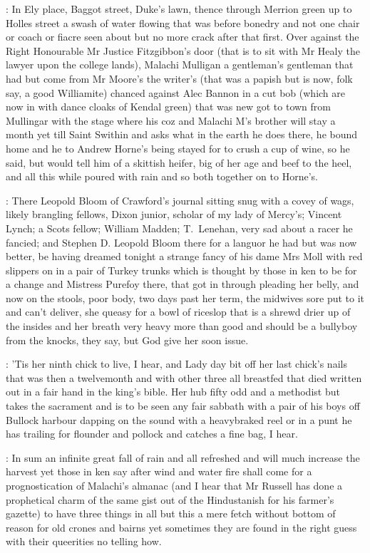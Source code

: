 \documentclass[12pt]{article}
\begin{document}
: In Ely place, Baggot street, Duke's lawn, thence through Merrion
green up to Holles street a swash of water flowing that was before bonedry
and not one chair or coach or fiacre seen about but no more crack after
that first. Over against the Right Honourable Mr Justice Fitzgibbon's door
(that is to sit with Mr Healy the lawyer upon the college lands), Malachi
Mulligan a gentleman's gentleman that had but come from Mr Moore's the
writer's (that was a papish but is now, folk say, a good Williamite)
chanced against Alec Bannon in a cut bob (which are now in with dance
cloaks of Kendal green) that was new got to town from Mullingar with the
stage where his coz and Malachi M's brother will stay a month yet till
Saint Swithin and asks what in the earth he does there, he bound home and
he to Andrew Horne's being stayed for to crush a cup of wine, so he said,
but would tell him of a skittish heifer, big of her age and beef to the
heel, and all this while poured with rain and so both together on to
Horne's.

: There Leopold Bloom of Crawford's journal sitting snug with a covey
of wags, likely brangling fellows, Dixon junior, scholar of my lady of
Mercy's; Vincent Lynch; a Scots fellow; William Madden; T.~Lenehan, very
sad about a racer he fancied; and Stephen D. Leopold Bloom there for a
languor he had but was now better, be having dreamed tonight a strange
fancy of his dame Mrs Moll with red slippers on in a pair of Turkey trunks
which is thought by those in ken to be for a change and Mistress Purefoy
there, that got in through pleading her belly, and now on the stools, poor
body, two days past her term, the midwives sore put to it and can't
deliver, she queasy for a bowl of riceslop that is a shrewd drier up of
the insides and her breath very heavy more than good and should be a
bullyboy from the knocks, they say, but God give her soon issue.

: 'Tis her ninth chick to live, I hear, and Lady day bit off her last
chick's nails that was then a twelvemonth and with other three all
breastfed that died written out in a fair hand in the king's bible. Her
hub fifty odd and a methodist but takes the sacrament and is to be seen
any fair sabbath with a pair of his boys off Bullock harbour dapping on
the sound with a heavybraked reel or in a punt he has trailing for
flounder and pollock and catches a fine bag, I hear.

: In sum an infinite great fall of rain and all refreshed and will much
increase the harvest yet those in ken say after wind and water fire shall
come for a prognostication of Malachi's almanac (and I hear that Mr
Russell has done a prophetical charm of the same gist out of the
Hindustanish for his farmer's gazette) to have three things in all but
this a mere fetch without bottom of reason for old crones and bairns yet
sometimes they are found in the right guess with their queerities no
telling how.
\end{document}
